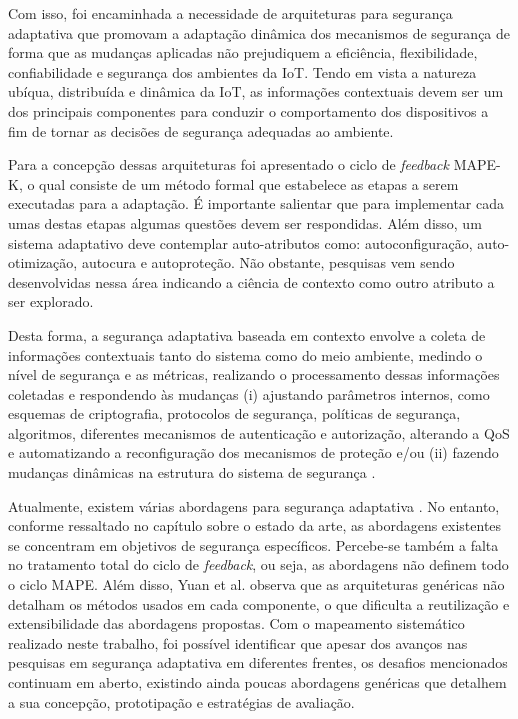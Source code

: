 \documentclass[tid,table]{texufpel} %
\newcommand {\AY} {\todo[inline, color=green]} %
\begin{document}
Com isso, foi encaminhada a necessidade de arquiteturas para segurança adaptativa que promovam a adaptação dinâmica dos mecanismos de segurança de forma que as mudanças aplicadas não prejudiquem a eficiência, flexibilidade, confiabilidade e segurança dos ambientes da IoT. Tendo em vista a natureza ubíqua,
distribuída e dinâmica da IoT, as informações contextuais devem ser um dos principais componentes para conduzir o comportamento dos dispositivos a fim de tornar as decisões de segurança adequadas ao ambiente. 

Para a concepção dessas arquiteturas foi apresentado o ciclo de \textit{feedback} MAPE-K, o qual consiste de um método formal que estabelece as etapas a serem executadas para a adaptação. É importante salientar que para implementar cada umas destas etapas algumas questões devem ser respondidas. Além disso, um sistema adaptativo deve contemplar auto-atributos como: autoconfiguração, auto-otimização, autocura e autoproteção. Não obstante, pesquisas vem sendo desenvolvidas nessa área indicando a ciência de contexto como outro atributo a ser explorado.

Desta forma, a segurança adaptativa baseada em contexto envolve a coleta de informações contextuais tanto do sistema como do meio ambiente, medindo o nível de segurança e as métricas, realizando o processamento dessas informações coletadas e respondendo às mudanças (i) ajustando parâmetros internos, como esquemas de criptografia, protocolos de segurança, políticas de segurança, algoritmos, diferentes mecanismos de autenticação e autorização, alterando a QoS e automatizando a reconfiguração dos mecanismos de proteção e/ou (ii) fazendo mudanças dinâmicas na estrutura do sistema de segurança \cite{habtamu12}.

Atualmente, existem várias abordagens para segurança adaptativa \cite{elkhodary07, yuan12}. No entanto, conforme ressaltado no capítulo sobre o estado da arte, as abordagens existentes se concentram em objetivos de segurança específicos. Percebe-se também a falta no tratamento total do ciclo de \textit{feedback}, ou seja, as abordagens não definem todo o ciclo MAPE. Além disso, Yuan et al. observa que as arquiteturas genéricas não detalham os métodos usados em cada componente, o que dificulta a reutilização e extensibilidade das abordagens propostas. Com o mapeamento sistemático realizado neste trabalho, foi possível identificar que apesar dos avanços nas pesquisas em segurança adaptativa em diferentes frentes, os desafios mencionados continuam em aberto, existindo ainda poucas abordagens genéricas que detalhem a sua concepção, prototipação e estratégias de avaliação.





\end{document}
